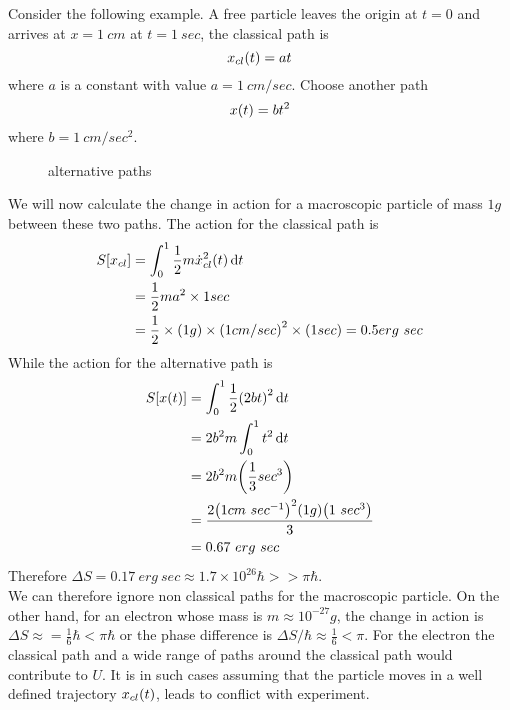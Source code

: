 	
	Consider the following example. A free particle leaves the origin at $t=0$ and arrives at $x=1\ cm$ at $t= 1 \ sec$, the classical path is 
	\begin{equation}
		x_{cl}\qty(t) = a t
	\end{equation}
	where $a$ is a constant with value $a=1\ cm/sec$. Choose another path
	\begin{equation}
		x\qty(t) = b t^2
	\end{equation}
	where $b= 1\ cm/sec^2$.
	
	
	\begin{figure}
		\caption{alternative paths}
	\end{figure}

	We will now calculate the change in action for a macroscopic particle of mass $1 g$ between these two paths. The action for the classical path is
	\begin{align*}
		S\qty[x_{cl}] 
		&= \int_{0}^{1} \frac{1}{2} m \dot{x}_{cl}^2\qty(t) \dd{t} \\
		&= \frac{1}{2} m a^2 \times 1 sec \\
		&= \frac{1}{2} \times \qty(1 g) \times \qty(1 cm/sec)^2 \times (1 sec) = 0.5 erg\ sec
	\end{align*}
	While the action for the alternative path is 
	\begin{align*}
		S\qty[x\qty(t)] 
		&=\int_{0}^{1}\frac{1}{2} \qty(2 b t)^2 \dd{t} \\
		&= 2 b^2 m \int_{0}^{1} t^2 \dd{t}\\
		&= 2 b^2 m \qty(\frac{1}{3} sec^3) \\
		&= \frac{2 \qty(1 cm\ {sec}^{-1})^2 \qty(1 g)\qty(1\ sec^3)}{3} \\
		&= 0.67\ erg \ sec
	\end{align*}
	Therefore $\Delta S = 0.17 \ erg\ sec \approx 1.7 \times 10^{26} \hbar >> \pi \hbar$.\\
	We can therefore ignore non classical paths for the macroscopic particle. On the other hand, for an electron whose mass is $m \approx 10^{-27} g$, the change in action is $\Delta S \approx = \frac{1}{6} \hbar < \pi \hbar$ or the phase difference is $\Delta S/\hbar \approx \frac{1}{6} < \pi$. For the electron the classical path and a wide range of paths around the classical path would contribute to $U$. It is in such cases assuming that the particle moves in a well defined trajectory $x_{cl}\qty(t)$, leads to conflict with experiment.
	
		
		
